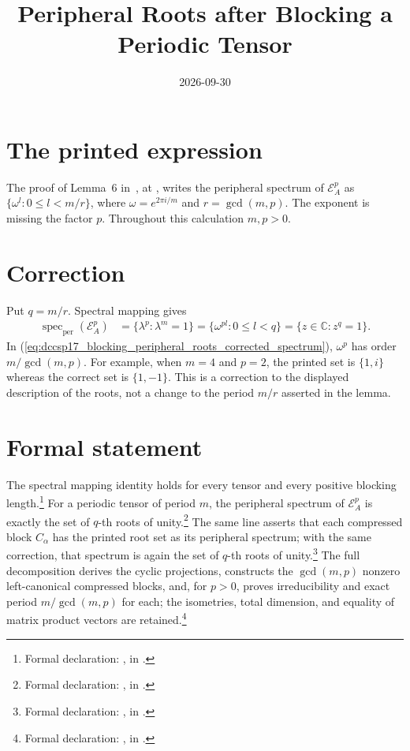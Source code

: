 \documentclass{article}
\title{Peripheral Roots after Blocking a Periodic Tensor}
\author{}
\date{2026-09-30}
\begin{document}
\maketitle
{}

\section{The printed expression}
The proof of Lemma~6 in~\cite{DeLasCuevas2017Irreducible}, at
, writes the peripheral spectrum
of $\mathcal E_A^p$ as $\{\omega^l:0\leq l<m/r\}$, where
$\omega=e^{2\pi i/m}$ and $r=\gcd(m,p)$. The exponent is missing the
factor $p$. Throughout this calculation $m,p>0$.

\section{Correction}
Put $q=m/r$. Spectral mapping gives
\begin{align}
    \operatorname{spec}_{\mathrm{per}}(\mathcal E_A^p)
     & =\{\lambda^p:\lambda^m=1\}
    =\{\omega^{pl}:0\leq l<q\}
    =\{z\in\mathbb C:z^q=1\}.
    \label{eq:dccsp17_blocking_peripheral_roots_corrected_spectrum}
\end{align}
In (\ref{eq:dccsp17_blocking_peripheral_roots_corrected_spectrum}), $\omega^p$ has order $m/\gcd(m,p)$. For example, when
$m=4$ and $p=2$, the printed set is $\{1,i\}$ whereas the correct set
is $\{1,-1\}$. This is a correction to the displayed description of the
roots, not a change to the period $m/r$ asserted in the lemma.

\section{Formal statement}
The spectral mapping identity holds for every tensor and every positive
blocking length.\footnote{Formal declaration:
    , in
    .}
For a periodic tensor of period $m$, the peripheral spectrum of
$\mathcal E_A^p$ is exactly the set of $q$-th roots of unity.\footnote{Formal
    declaration: , in
    .}
The same line asserts that each compressed block $C_\alpha$ has the printed
root set as its peripheral spectrum; with the same correction, that spectrum is
again the set of $q$-th roots of unity.\footnote{Formal declaration:
    , in
    .}
The full decomposition derives the cyclic projections, constructs the
$\gcd(m,p)$ nonzero left-canonical compressed blocks, and, for $p>0$, proves
irreducibility and exact period $m/\gcd(m,p)$ for each; the isometries, total
dimension, and equality of matrix product vectors are retained.\footnote{Formal
    declaration:
    , in
    .}



\end{document}
